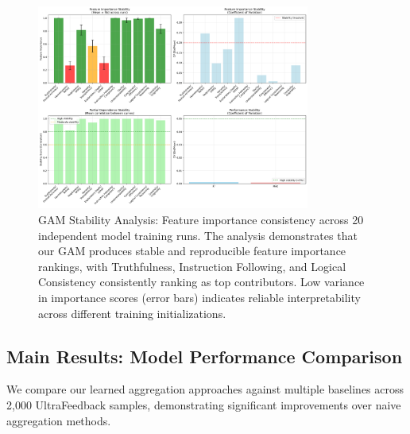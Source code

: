 \begin{figure}[htbp]
    \centering
    \includegraphics[width=0.8\textwidth]{results/full_experiments/baseline_ultrafeedback_2000samples_20250816_213023/gam_stability_analysis_20250817_184356/gam_stability_analysis.png}
    \caption{GAM Stability Analysis: Feature importance consistency across 20 independent model training runs. The analysis demonstrates that our GAM produces stable and reproducible feature importance rankings, with Truthfulness, Instruction Following, and Logical Consistency consistently ranking as top contributors. Low variance in importance scores (error bars) indicates reliable interpretability across different training initializations.}
    \label{fig:gam_stability}
\end{figure}

\subsection{Main Results: Model Performance Comparison}

We compare our learned aggregation approaches against multiple baselines across 2,000 UltraFeedback samples, demonstrating significant improvements over naive aggregation methods.


